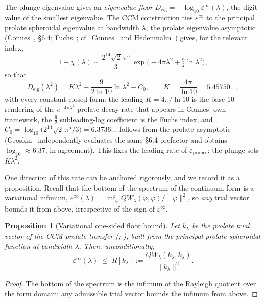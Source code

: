 \documentclass[11pt,a4paper]{article}
\newtheorem{proposition}{Proposition}
\begin{document}
The plunge eigenvalue gives an \emph{eigenvalue floor}
$D_{\mathrm{eig}}=-\log_{10}\varepsilon^\infty(\lambda)$, the digit value of the
smallest eigenvalue. The CCM construction ties $\varepsilon^\infty$ to the
principal prolate spheroidal eigenvalue at bandwidth $\lambda$; the prolate
eigenvalue asymptotic (Connes~\cite{Connes2026}, \S6.4; Fuchs~\cite{Fuchs1964};
cf.\ Connes~\cite{ConnesProlate} and Hedenmalm~\cite{Hedenmalm2026}) gives, for
the relevant index,
\[
  1-\chi(\lambda)\sim \frac{2^{14}\sqrt{2}\,\pi^5}{3}\,
  \exp\!\bigl(-4\pi\lambda^2+\tfrac92\ln\lambda^2\bigr),
\]
so that
\begin{equation}\label{eq:eigfloor}
  D_{\mathrm{eig}}(\lambda^2)=K\lambda^2-\frac{9}{2\ln10}\ln\lambda^2-C_0,
  \qquad K=\frac{4\pi}{\ln10}=5.45750\ldots,
\end{equation}
with every constant closed-form: the leading $K=4\pi/\ln10$ is the base-$10$
rendering of the $e^{-4\pi\lambda^2}$ prolate decay rate that appears in Connes'
own framework, the $\tfrac92$ subleading-log coefficient is the Fuchs index, and
$C_0=\log_{10}\!\bigl(2^{14}\sqrt{2}\,\pi^5/3\bigr)=6.3736\ldots$ follows from the
prolate asymptotic (Groskin~\cite{Groskin2026} independently evaluates the same
\S6.4 prefactor and obtains $\log_{10}\approx6.37$, in agreement). This fixes the
leading rate of $\varepsilon_{\mathrm{primes}}$: the plunge sets $K\lambda^2$.

One direction of this rate can be anchored rigorously, and we record it as a
proposition. Recall that the bottom of the spectrum of the continuum form is a
variational infimum, $\varepsilon^\infty(\lambda)=\inf_\varphi
QW_\lambda(\varphi,\varphi)/\|\varphi\|^2$, so \emph{any} trial vector bounds it
from above, irrespective of the sign of $\varepsilon^\infty$.

\begin{proposition}[Variational one-sided floor bound]\label{prop:variational}
Let $k_\lambda$ be the prolate trial vector of the CCM prolate transfer
(\cite[\S\S7--8]{CCM2025}; \cite{ConnesConsaniZC}), built from the principal
prolate spheroidal function at bandwidth $\lambda$. Then, unconditionally,
\[
  \varepsilon^\infty(\lambda)\;\le\;
  R[k_\lambda]:=\frac{QW_\lambda(k_\lambda,k_\lambda)}{\|k_\lambda\|^2}.
\]
\end{proposition}
\begin{proof}
The bottom of the spectrum is the infimum of the Rayleigh quotient over the
form domain; any admissible trial vector bounds the infimum from above.
\end{proof}
\end{document}

